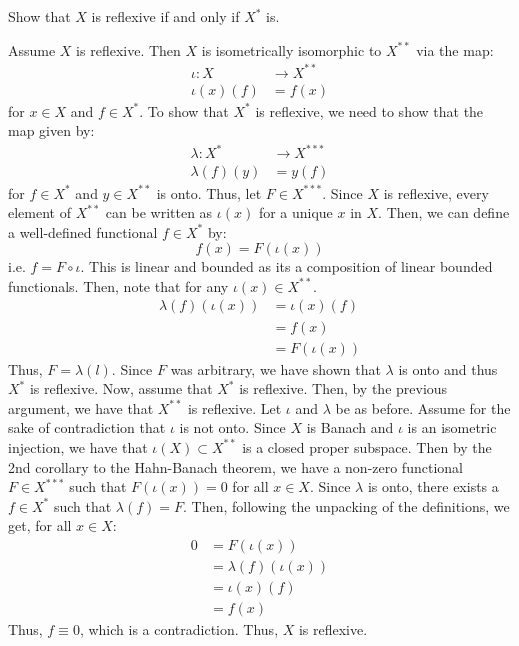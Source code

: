 \documentclass[12pt]{article}
\begin{document}
\begin{problem}{43}
    Show that $X$ is reflexive if and only if $X^*$ is. 
\end{problem}
\begin{solution}
    Assume $X$ is reflexive. Then $X$ is isometrically isomorphic to $X^{**}$ via the map: 
    \begin{align*}
        \iota: X &\to X^{**} \\
        \iota(x)(f) &= f(x)
    \end{align*}
    for $x \in X$ and $f \in X^*$. To show that $X^*$ is reflexive, we need to show that the map given by: 
    \begin{align*}
        \lambda: X^* &\to X^{***} \\
        \lambda(f)(y) &= y(f)
    \end{align*}    
    for $f \in X^*$ and $y \in X^{**}$ is onto. \bbni 
    Thus, let $F \in X^{***}$. Since $X$ is reflexive, every element of $X^{**}$ can be written as $\iota(x)$ for a unique $x$ in $X$. Then, we can define a well-defined functional $f \in X^*$ by: 
    \[ f(x) = F(\iota(x)) \]
    i.e. $f = F \circ \iota$. This is linear and bounded as its a composition of linear bounded functionals. Then, note that for any $\iota(x) \in X^{**}$. 
    \begin{align*}
        \lambda(f)(\iota(x)) &= \iota(x)(f) \\
        &= f(x) \\
        &= F(\iota(x))
    \end{align*}
    Thus, $F = \lambda(l)$. Since $F$ was arbitrary, we have shown that $\lambda$ is onto and thus $X^*$ is reflexive. \bbni
    Now, assume that $X^*$ is reflexive. Then, by the previous argument, we have that $X^{**}$ is reflexive. Let $\iota$ and $\lambda$ be as before. Assume for the sake of contradiction that $\iota$ is not onto. \bbni 
    Since $X$ is Banach and $\iota$ is an isometric injection, we have that $\iota(X) \subset X^{**}$ is a closed proper subspace. Then by the 2nd corollary to the Hahn-Banach theorem, we have a non-zero functional $F \in X^{***}$ such that $F(\iota(x)) = 0$ for all $x \in X$. Since $\lambda$ is onto, there exists a $f \in X^*$ such that $\lambda(f) = F$. Then, following the unpacking of the definitions, we get, for all $x \in X$: 
    \begin{align*}
        0 &= F(\iota(x)) \\ 
        &= \lambda(f)(\iota(x)) \\
        &= \iota(x)(f) \\
        &= f(x) 
    \end{align*}
    Thus, $f \equiv 0$, which is a contradiction. Thus, $X$ is reflexive. 
\end{solution}
\newpage
\end{document}
